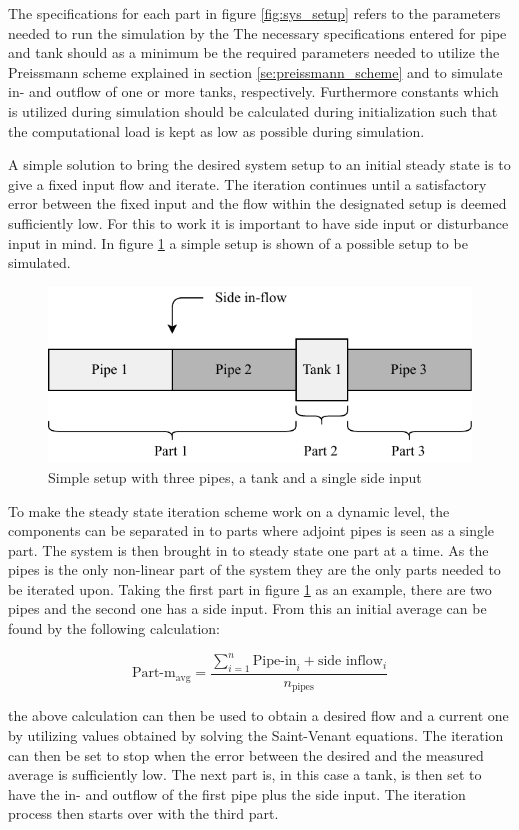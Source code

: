 The specifications for each part in figure \ref{fig:sys_setup} refers to the parameters needed to run the simulation by the 
The necessary specifications entered for pipe and tank should as a minimum be the required parameters needed to utilize the Preissmann scheme explained in section \ref{se:preissmann_scheme} and to simulate in- and outflow of one or more tanks, respectively. Furthermore constants which is utilized during simulation should be calculated during initialization such that the computational load is kept as low as possible during simulation. 

A simple solution to bring the desired system setup to an initial steady state is to give a fixed input flow and iterate. 
The iteration continues until a satisfactory error between the fixed input and the flow within the designated setup is deemed sufficiently low. For this to work it is important to have side input or disturbance input in mind. In figure \ref{fig:simple_sewer} a simple setup is shown of a possible setup to be simulated. 

\begin{figure}[H]
\centering
\includegraphics[width=0.55 \textwidth]{report/simulation/pictures/simple_sewer.pdf}
\caption{Simple setup with three pipes, a tank and a single side input}
\label{fig:simple_sewer}
\end{figure}

To make the steady state iteration scheme work on a dynamic level, the components can be separated in to parts where adjoint pipes is seen as a single part. The system is then brought in to steady state one part at a time. As the pipes is the only non-linear part of the system they are the only parts needed to be iterated upon. Taking the first part in figure \ref{fig:simple_sewer} as an example, there are two pipes and the second one has a side input.
From this an initial average can be found by the following calculation:

\begin{equation}
 \text{Part-m}_{\text{avg}}	=  \frac{ \sum\limits_{i=1}^n \text{Pipe-in}_i + \text{side inflow}_i }{ n_{\text{pipes}} } 
 \end{equation} \label{avg_init_flow}

the above calculation can then be used to obtain a desired flow and a current one by utilizing values obtained by solving the Saint-Venant equations. The iteration can then be set to stop when the error between the desired and the measured average is sufficiently low. The next part is, in this case a tank, is then set to have the in- and outflow of the first pipe plus the side input. The iteration process then starts over with the third part.


  



